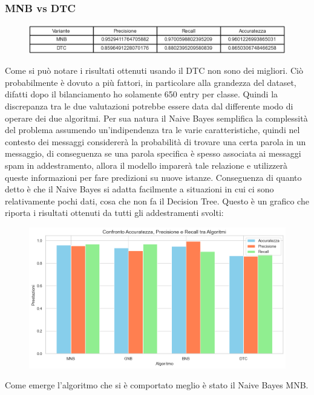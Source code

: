 \documentclass[]{article}
\begin{document}
                    \subsubsection{MNB vs DTC}

                        \begin{figure}[H]
                            \centering
                            \includegraphics[width=1\linewidth]{images/FinalTable.png}
                            \label{fig:enter-label}
                        \end{figure}

                        Come si può notare i risultati ottenuti  usando il DTC non sono dei migliori. Ciò probabilmente è dovuto a più fattori, in particolare  alla grandezza del dataset, difatti dopo il bilanciamento ho solamente 650 entry per classe. Quindi la discrepanza tra le due valutazioni potrebbe essere data dal differente modo di operare dei due algoritmi. Per sua natura il Naive Bayes semplifica la complessità del problema assumendo un'indipendenza tra le varie caratteristiche, quindi nel contesto dei messaggi considererà la probabilità di trovare una certa parola in un messaggio, di conseguenza se una parola specifica è spesso associata ai messaggi spam in addestramento, allora il modello imparerà tale relazione e utilizzerà queste informazioni per fare predizioni su nuove istanze. Conseguenza di quanto detto è che il Naive Bayes si adatta facilmente a situazioni in cui ci sono relativamente pochi dati, cosa che non fa il Decision Tree.
                        Questo è un grafico che riporta i risultati ottenuti da tutti gli addestramenti svolti:
                        \begin{figure}[H]
                            \centering
                            \includegraphics[width=1\linewidth]{images/AllResult.png}
                            \label{fig:enter-label}
                        \end{figure}
                        Come emerge l'algoritmo che si è comportato meglio è stato il Naive Bayes MNB.
        \newpage
\end{document}
